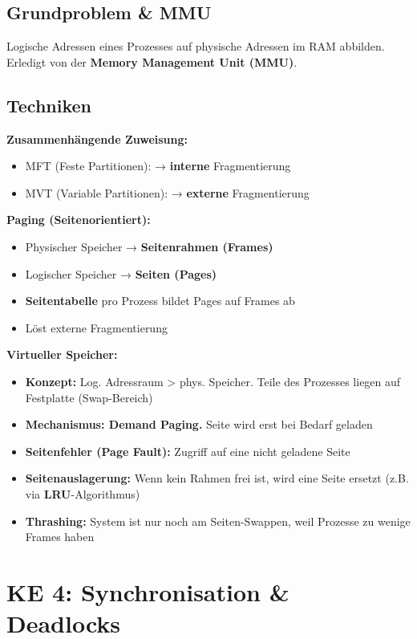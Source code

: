 \documentclass[9pt,a4paper]{extarticle}
\begin{document}
\begin{multicols*}{2}
\subsection{Grundproblem \& MMU}
Logische Adressen eines Prozesses auf physische Adressen im RAM abbilden. Erledigt von der \textbf{Memory Management Unit (MMU)}.

\subsection{Techniken}
\textbf{Zusammenhängende Zuweisung:}
\begin{itemize}
\item MFT (Feste Partitionen): → \textbf{interne} Fragmentierung
\item MVT (Variable Partitionen): → \textbf{externe} Fragmentierung
\end{itemize}

\textbf{Paging (Seitenorientiert):}
\begin{itemize}
\item Physischer Speicher → \textbf{Seitenrahmen (Frames)}
\item Logischer Speicher → \textbf{Seiten (Pages)}
\item \textbf{Seitentabelle} pro Prozess bildet Pages auf Frames ab
\item Löst externe Fragmentierung
\end{itemize}

\textbf{Virtueller Speicher:}
\begin{itemize}
\item \textbf{Konzept:} Log. Adressraum > phys. Speicher. Teile des Prozesses liegen auf Festplatte (Swap-Bereich)
\item \textbf{Mechanismus: Demand Paging.} Seite wird erst bei Bedarf geladen
\item \textbf{Seitenfehler (Page Fault):} Zugriff auf eine nicht geladene Seite
\item \textbf{Seitenauslagerung:} Wenn kein Rahmen frei ist, wird eine Seite ersetzt (z.B. via \textbf{LRU}-Algorithmus)
\item \textbf{Thrashing:} System ist nur noch am Seiten-Swappen, weil Prozesse zu wenige Frames haben
\end{itemize}

\section{KE 4: Synchronisation \& Deadlocks}


\end{multicols*}
\end{document}
